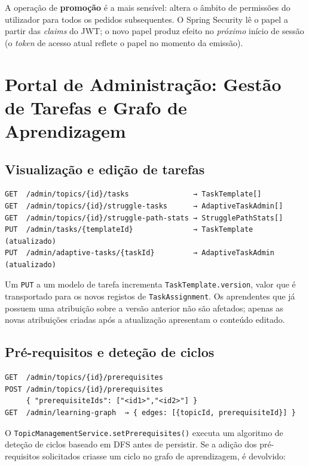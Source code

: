 A operação de \textbf{promoção} é a mais sensível: altera o âmbito de
permissões do utilizador para todos os pedidos subsequentes.
O Spring Security lê o papel a partir das \textit{claims} do JWT; o novo
papel produz efeito no \emph{próximo} início de sessão (o \textit{token}
de acesso atual reflete o papel no momento da emissão).

\section{Portal de Administração: Gestão de Tarefas e Grafo de Aprendizagem}
\label{sec:tarefas_grafo}

\subsection*{Visualização e edição de tarefas}

\begin{verbatim}
GET  /admin/topics/{id}/tasks               → TaskTemplate[]
GET  /admin/topics/{id}/struggle-tasks      → AdaptiveTaskAdmin[]
GET  /admin/topics/{id}/struggle-path-stats → StrugglePathStats[]
PUT  /admin/tasks/{templateId}              → TaskTemplate (atualizado)
PUT  /admin/adaptive-tasks/{taskId}         → AdaptiveTaskAdmin (atualizado)
\end{verbatim}

Um \texttt{PUT} a um modelo de tarefa incrementa
\texttt{TaskTemplate.version}, valor que é transportado para os novos
registos de \texttt{TaskAssignment}.
Os aprendentes que já possuem uma atribuição sobre a versão anterior não
são afetados; apenas as novas atribuições criadas após a atualização
apresentam o conteúdo editado.

\subsection*{Pré-requisitos e deteção de ciclos}

\begin{verbatim}
GET  /admin/topics/{id}/prerequisites
POST /admin/topics/{id}/prerequisites
     { "prerequisiteIds": ["<id1>","<id2>"] }
GET  /admin/learning-graph  → { edges: [{topicId, prerequisiteId}] }
\end{verbatim}

O \texttt{TopicManagementService.setPrerequisites()} executa um algoritmo
de deteção de ciclos baseado em DFS antes de persistir.
Se a adição dos pré-requisitos solicitados criasse um ciclo no grafo de
aprendizagem, é devolvido:

